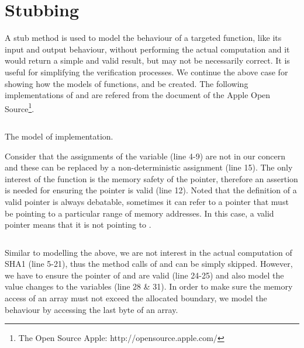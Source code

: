 \section{Stubbing} \label{subsec:stubbing}
A stub method is used to model the behaviour of a targeted function, like its input and output behaviour, without performing the actual computation and it would return a simple and valid result, but may not be necessarily correct. It is useful for simplifying the verification processes. We continue the above case for showing how the models of functions,  and  be created. The following implementations of  and  are refered from the document of the Apple Open Source\footnote{The Open Source Apple: http://opensource.apple.com/}.

\begin{listing}[t]
\inputminted[frame=single, breaklines, linenos, numbersep=5pt, tabsize=4, fontsize=\footnotesize]{c}{./contents/code/stubs/CC_SHA1_Init.c} %
\caption{The model of  implementation.}
\end{listing}

Consider that the assignments of the variable  (line 4-9) are not in our concern and these can be replaced by a non-deterministic assignment (line 15). The only interest of the function is the memory safety of the pointer, therefore an assertion is needed for ensuring the pointer is valid (line 12). Noted that the definition of a valid pointer is always debatable, sometimes it can refer to a pointer that must be pointing to a particular range of memory addresses. In this case, a valid pointer means that it is not pointing to . 

\inputminted[frame=single, breaklines, linenos, numbersep=5pt, tabsize=4, fontsize=\footnotesize]{c}{./contents/code/stubs/CC_SHA1_Final.c}

Similar to modelling the  above, we are not interest in the actual computation of SHA1 (line 5-21), thus the method calls of  and  can be simply skipped. However, we have to ensure the pointer of  and  are valid (line 24-25) and also model the value changes to the variables (line 28 \& 31). 
In order to make sure the memory access of an array must not exceed the allocated boundary, we model the behaviour by accessing the last byte of an array.


